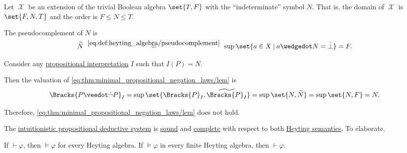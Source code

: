 \begin{example}\label{ex:heyting_semantics_lem_counterexample}
  Let \( \mscrX \) be an extension of the trivial Boolean algebra \( \set{ T, F } \) with the \enquote{indeterminate} symbol \( N \). That is, the domain of \( \mscrX \) is \( \set{ F, N, T } \) and the order is \( F \leq N \leq T \).

  The pseudocomplement of \( N \) is
  \begin{equation*}
    \widetilde{N}
    \reloset {\eqref{eq:def:heyting_algebra/pseudocomplement}} =
    \sup\set{ a \in X \given a \synwedge N = \synbot }
    =
    F.
  \end{equation*}

  Consider any \hyperref[def:propositional_valuation]{propositional interpretation} \( I \) such that \( I(P) = N \).

  Then the valuation of \eqref{eq:thm:minimal_propositional_negation_laws/lem} is
  \begin{equation*}
    \Bracks{P \synvee \synneg P}_I
    =
    \sup\set{ \Bracks{P}_I, \widetilde{\Bracks{P}_I} }
    =
    \sup\set{ N, \widetilde{N} }
    =
    \sup\set{ N, F }
    =
    N.
  \end{equation*}

  Therefore, \eqref{eq:thm:minimal_propositional_negation_laws/lem} does not hold.
\end{example}

\begin{theorem}\label{thm:intuitionistic_propositional_logic_is_sound_and_complete}
  The \hyperref[def:intuitionistic_propositional_deduction_systems]{intuitionistic propositional deductive system} is \hyperref[def:logical_framework/soundness]{sound} and \hyperref[def:logical_framework/completeness]{complete} with respect to both \hyperref[def:propositional_heyting_algebra_semantics]{Heyting semantics}. To elaborate,
  \begin{thmenum}
     If \( \vdash \varphi \), then \( \vDash \varphi \) for every Heyting algebra.
     If \( \vDash \varphi \) in every finite Heyting algebra, then \( \vdash \varphi \).
  \end{thmenum}
\end{theorem}

